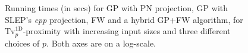 \documentclass[twoside,11pt]{article}
\newcommand{\tvell}{\text{Tv}}
\newcommand{\oned}{\text{1D}}
\numberwithin{equation}{section}
\numberwithin{theorem}{section}
\begin{document}
\begin{figure}[htbp]
  \centering
  \caption{Running times (in secs) for GP with PN projection, GP with SLEP's {\it epp} projection, FW and a hybrid GP+FW algorithm, for $\tvell_p^{\oned}$-proximity with increasing input sizes and three different choices of $p$. Both axes are on a log-scale.
   \label{fig:tvpfixedrun}
   }
\end{figure}
\end{document}
